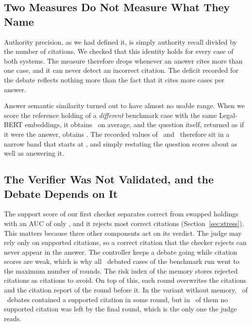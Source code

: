 \documentclass[conference]{IEEEtran}
\begin{document}
\subsection{Two Measures Do Not Measure What They Name}
Authority precision, as we had defined it, is simply authority recall divided by the number of citations. We checked that this identity holds for every case of both systems. The measure therefore drops whenever an answer cites more than one case, and it can never detect an incorrect citation. The deficit recorded for the debate reflects nothing more than the fact that it cites more cases per answer.

Answer semantic similarity turned out to have almost no usable range. When we score the reference holding of a \emph{different} benchmark case with the same Legal-BERT embeddings, it obtains \ResAudSimFloor\ on average, and the question itself, returned as if it were the answer, obtains \ResAudSimQuestion. The recorded values of \ResLexASS\ and \ResBaseASS\ therefore sit in a narrow band that starts at \ResAudSimFloor, and simply restating the question scores about as well as answering it.

\subsection{The Verifier Was Not Validated, and the Debate Depends on It}
The support score of our first checker separates correct from swapped holdings with an AUC of only \ResStressAUC, and it rejects most correct citations (Section~\ref{sec:stress}). This matters because three other components act on its verdict. The judge may rely only on supported citations, so a correct citation that the checker rejects can never appear in the answer. The controller keeps a debate going while citation scores are weak, which is why all \ResAudDebatedAtMaxRounds\ debated cases of the benchmark run went to the maximum number of rounds. The risk index of the memory stores rejected citations as citations to avoid. On top of this, each round overwrites the citations and the citation report of the round before it. In the variant without memory, \ResAudAThreeSupportedAny\ of \ResAudAThreeDebates\ debates contained a supported citation in some round, but in \ResAudAThreeSupportLost\ of them no supported citation was left by the final round, which is the only one the judge reads.
\end{document}
